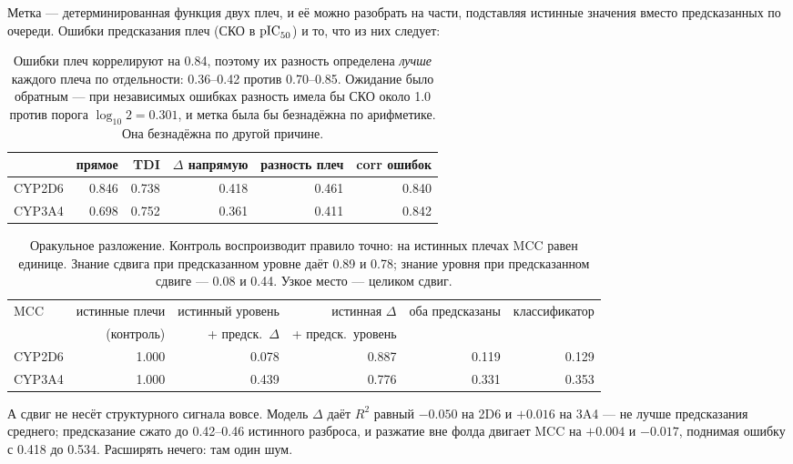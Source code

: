 Метка --- детерминированная функция двух плеч, и её можно разобрать на части, подставляя истинные
значения вместо предсказанных по очереди. Ошибки предсказания плеч (СКО в $\mathrm{pIC}_{50}$) и то, что из них
следует:

\begin{table}[htbp]\centering\small
\begin{tabularx}{0.88\textwidth}{@{}Xrrrrr@{}}
\toprule
 & прямое & TDI & $\Delta$ напрямую & разность плеч & corr ошибок \\
\midrule
CYP2D6 & 0.846 & 0.738 & 0.418 & 0.461 & 0.840 \\
CYP3A4 & 0.698 & 0.752 & 0.361 & 0.411 & 0.842 \\
\bottomrule
\end{tabularx}
\caption{Ошибки плеч коррелируют на 0.84, поэтому их разность определена \emph{лучше} каждого
плеча по отдельности: 0.36--0.42 против 0.70--0.85. Ожидание было обратным --- при независимых
ошибках разность имела бы СКО около 1.0 против порога $\log_{10}2 = 0.301$, и метка была бы
безнадёжна по арифметике. Она безнадёжна по другой причине.}
\label{tab:tdiarms}
\end{table}

\begin{table}[htbp]\centering\small
\begin{tabularx}{0.88\textwidth}{@{}Xrrrrr@{}}
\toprule
MCC & истинные плечи & истинный уровень & истинная $\Delta$ & оба предсказаны & классификатор \\
 & (контроль) & + предск.\ $\Delta$ & + предск.\ уровень & & \\
\midrule
CYP2D6 & 1.000 & 0.078 & 0.887 & 0.119 & 0.129 \\
CYP3A4 & 1.000 & 0.439 & 0.776 & 0.331 & 0.353 \\
\bottomrule
\end{tabularx}
\caption{Оракульное разложение. Контроль воспроизводит правило точно: на истинных плечах MCC
равен единице. Знание сдвига при предсказанном уровне даёт 0.89 и 0.78; знание уровня при
предсказанном сдвиге --- 0.08 и 0.44. Узкое место --- целиком сдвиг.}
\label{tab:tdioracle}
\end{table}

А сдвиг не несёт структурного сигнала вовсе. Модель $\Delta$ даёт $R^2$ равный $-0.050$ на 2D6
и $+0.016$ на 3A4 --- не лучше предсказания среднего; предсказание сжато до 0.42--0.46 истинного
разброса, и разжатие вне фолда двигает MCC на $+0.004$ и $-0.017$, поднимая ошибку с 0.418 до
0.534. Расширять нечего: там один шум.

